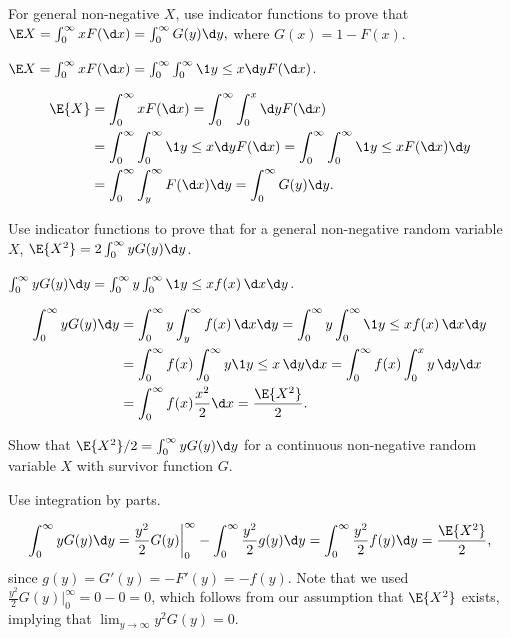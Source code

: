 \documentclass[queueing_book]{subfiles}
\begin{document}
\begin{exercise}\label{ex:l-107}
For  general non-negative $X$,  use indicator functions to prove that
$ \E X = \int_0^\infty x F(\d x) = \int_0^\infty G(y) \d y,$
where $G(x) = 1 - F(x)$.
\begin{hint}
$\E X = \int_0^\infty x F(\d x) = \int_0^\infty \int_0^\infty \1{y\leq x} \d y F(\d x)$.
\end{hint}
\begin{solution}
 \begin{align*}
 \E{X} &= \int_0^\infty x F(\d x) = \int_0^\infty \int_0^x \d y F(\d x) \\
 & = \int_0^\infty \int_0^\infty \1{y\leq x} \d y F(\d x) = \int_0^\infty \int_0^\infty \1{y\leq x} F(\d x) \d y\\
 & = \int_0^\infty \int_y^\infty F(\d x) \d y = \int_0^\infty G(y) \d y.
 \end{align*}
\end{solution}
\end{exercise}


\begin{exercise}
  Use indicator functions to prove that for a general non-negative random variable~$X$, $ \E{X^2} = 2 \int_0^\infty y G(y) \d y$.
\begin{hint}
$\int_0^\infty y G(y) \d y = \int_0^\infty y \int_0^\infty \1{y\leq x}f(x)\, \d x \d y$.
\end{hint}
\begin{solution}
 \begin{align*}
\int_0^\infty y G(y) \d y
&= \int_0^\infty y \int_y^\infty f(x)\, \d x \d y = \int_0^\infty y \int_0^\infty \1{y\leq x}f(x)\, \d x \d y\\
&= \int_0^\infty f(x) \int_0^\infty y \1{y \leq x}\, \d y \d x
= \int_0^\infty f(x) \int_0^x y\, \d y \d x\\
&= \int_0^\infty f(x) \frac{x^2}2 \d x =\frac{\E{X^2}}2.
 \end{align*}
\end{solution}
\end{exercise}

\begin{exercise}\label{ex:l-108}
 Show that $\E{X^2}/2 = \int_0^\infty y G(y) \d y$ for a continuous non-negative random variable $X$ with survivor function $G$.
 \begin{solution}
 \begin{hint}
 Use integration by parts.
 \end{hint}
 \begin{equation*}
 \int_0^\infty y G(y) \d y
= \frac{y^2}2 G(y) \bigg|_0^\infty - \int_0^\infty \frac{y^2}2 g(y)\d y = \int_0^\infty \frac{y^2}2 f(y)\d y = \frac{\E{X^2}}2,
 \end{equation*}
 since $g(y) = G'(y) = - F'(y) = - f(y)$. Note that we used $\frac{y^2}2 G(y) \bigg|_0^\infty = 0 - 0 = 0$, which follows from our assumption that $\E{X^2}$ exists, implying that $\lim_{y \to \infty} y^2G(y) = 0$.
\end{solution}
\end{exercise}
\end{document}
